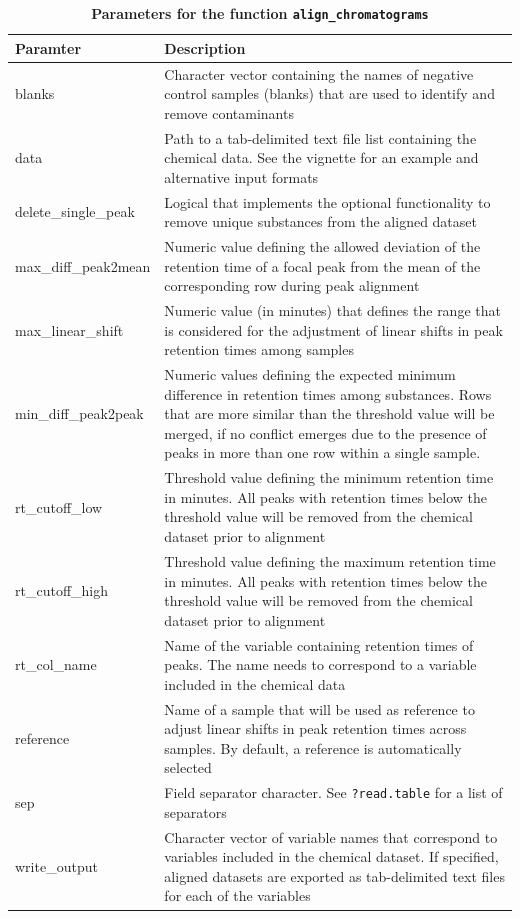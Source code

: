 \documentclass[10pt,letterpaper]{article}
\begin{document}
\begin{table}[!ht]
\begin{adjustwidth}{-2.25in}{0in} %
\centering
\caption{\textbf{Parameters for the function \texttt{align\_chromatograms}}}
\label{table:table1}
\begin{tabular}{|p{3.2cm}|p{9cm}|} 
\hline
\textbf{Paramter} & \textbf{Description} \\ \hline
blanks & Character vector containing the names of negative control samples (blanks) that are used to identify and remove contaminants \\
\hline
data & Path to a tab-delimited text file list containing the chemical data. See the vignette for an example and alternative input formats \\
\hline
delete\_single\_peak & Logical that implements the optional functionality to remove unique substances from the aligned dataset \\
\hline
max\_diff\_peak2mean & Numeric value defining the allowed deviation of the retention time of a focal peak from the mean of the corresponding row during peak alignment \\
\hline
max\_linear\_shift & Numeric value (in minutes) that defines the range that is considered for the adjustment of linear shifts in peak retention times among samples \\
\hline
min\_diff\_peak2peak & Numeric values defining the expected minimum difference in retention times among substances. Rows that are more similar than the threshold value will be merged, if no conflict emerges due to the presence of peaks in more than one row within a single sample. \\
\hline
rt\_cutoff\_low & Threshold value defining the minimum retention time in minutes. All peaks with retention times below the threshold value will be removed from the chemical dataset prior to alignment\\
\hline
rt\_cutoff\_high & Threshold value defining the maximum retention time in minutes. All peaks with retention times below the threshold value will be removed from the chemical dataset prior to alignment\\
\hline
rt\_col\_name & Name of the variable containing retention times of peaks. The name needs to correspond to a variable included in the chemical data \\
\hline
reference & Name of a sample that will be used as reference to adjust linear shifts in peak retention times across samples. By default, a reference is automatically selected\\ 
\hline
sep & Field separator character. See \texttt{?read.table} for a list of separators\\
\hline
write\_output & Character vector of variable names that correspond to variables included in the chemical  dataset. If specified, aligned datasets are exported as tab-delimited text files for each of the variables\\
\hline
\end{tabular}
\end{adjustwidth}
\end{table}
\end{document}
